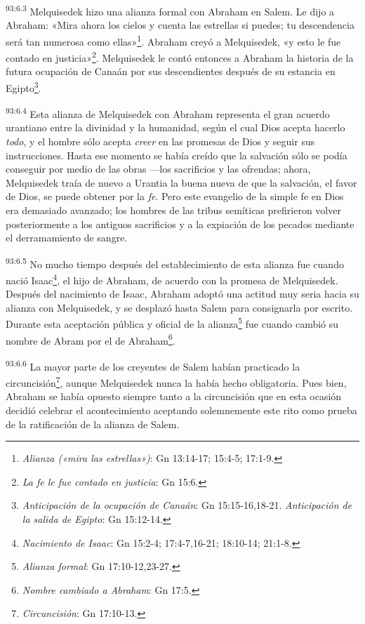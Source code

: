 \par
\textsuperscript{93:6.3} Melquisedek hizo una alianza formal con Abraham en Salem. Le dijo a Abraham: «Mira ahora los cielos y cuenta las estrellas si puedes; tu descendencia será tan numerosa como ellas»\footnote{\textit{Alianza («mira las estrellas»)}: Gn 13:14-17; 15:4-5; 17:1-9.}. Abraham creyó a Melquisedek, «y esto le fue contado en justicia»\footnote{\textit{La fe le fue contado en justicia}: Gn 15:6.}. Melquisedek le contó entonces a Abraham la historia de la futura ocupación de Canaán por sus descendientes después de su estancia en Egipto\footnote{\textit{Anticipación de la ocupación de Canaán}: Gn 15:15-16,18-21. \textit{Anticipación de la salida de Egipto}: Gn 15:12-14.}.

\par
\textsuperscript{93:6.4} Esta alianza de Melquisedek con Abraham representa el gran acuerdo urantiano entre la divinidad y la humanidad, según el cual Dios acepta hacerlo \textit{todo}, y el hombre sólo acepta \textit{creer} en las promesas de Dios y seguir sus instrucciones. Hasta ese momento se había creído que la salvación sólo se podía conseguir por medio de las obras ---los sacrificios y las ofrendas; ahora, Melquisedek traía de nuevo a Urantia la buena nueva de que la salvación, el favor de Dios, se puede obtener por la \textit{fe}. Pero este evangelio de la simple fe en Dios era demasiado avanzado; los hombres de las tribus semíticas prefirieron volver posteriormente a los antiguos sacrificios y a la expiación de los pecados mediante el derramamiento de sangre.

\par
\textsuperscript{93:6.5} No mucho tiempo después del establecimiento de esta alianza fue cuando nació Isaac\footnote{\textit{Nacimiento de Isaac}: Gn 15:2-4; 17:4-7,16-21; 18:10-14; 21:1-8.}, el hijo de Abraham, de acuerdo con la promesa de Melquisedek. Después del nacimiento de Isaac, Abraham adoptó una actitud muy seria hacia su alianza con Melquisedek, y se desplazó hasta Salem para consignarla por escrito. Durante esta aceptación pública y oficial de la alianza\footnote{\textit{Alianza formal}: Gn 17:10-12,23-27.} fue cuando cambió su nombre de Abram por el de Abraham\footnote{\textit{Nombre cambiado a Abraham}: Gn 17:5.}.

\par
\textsuperscript{93:6.6} La mayor parte de los creyentes de Salem habían practicado la circuncisión\footnote{\textit{Circuncisión}: Gn 17:10-13.}, aunque Melquisedek nunca la había hecho obligatoria. Pues bien, Abraham se había opuesto siempre tanto a la circuncisión que en esta ocasión decidió celebrar el acontecimiento aceptando solemnemente este rito como prueba de la ratificación de la alianza de Salem.

